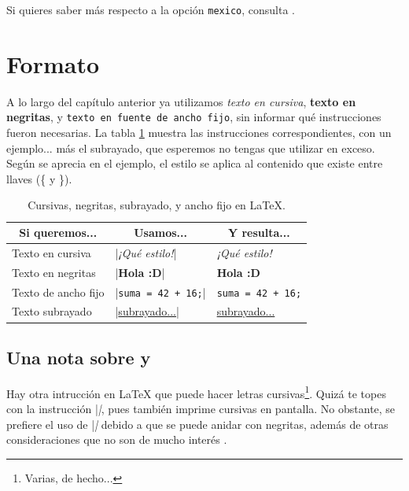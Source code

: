 Si quieres saber más respecto a la opción \texttt{mexico}, consulta \cite{bib:opciones_spanish}.



\section{Formato}
\label{sec:formato}



A lo largo del capítulo anterior ya utilizamos \emph{texto en cursiva}, \textbf{texto en negritas}, y \texttt{texto en fuente de ancho fijo}, sin informar qué instrucciones fueron necesarias. La tabla \ref{tab:instrucciones_estilo} muestra las instrucciones correspondientes, con un ejemplo... más el subrayado, que esperemos no tengas que utilizar en exceso. Según se aprecia en el ejemplo, el estilo se aplica al contenido que existe entre llaves (\{ y \}).

\begin{table}[ht!]
\centering
\begin{tabular}{lll}
\hline
\multicolumn{1}{c}{\textbf{Si queremos...}} & \multicolumn{1}{c}{\textbf{Usamos...}} & \multicolumn{1}{c}{\textbf{Y resulta...}}   \\
\hline
Texto en cursiva    & |\emph{¡Qué estilo!}|         & \emph{¡Qué estilo!}             \\
Texto en negritas   & |\textbf{Hola :D}|            & \textbf{Hola :D}                \\
Texto de ancho fijo & |\texttt{suma = 42 + 16;}|    & \texttt{suma = 42 + 16;}        \\
Texto subrayado     & |\underline{subrayado...}|    & \underline{subrayado...}        \\
\hline
\end{tabular}
\caption{Cursivas, negritas, subrayado, y ancho fijo en \LaTeX.} %
\label{tab:instrucciones_estilo}
\end{table}



\subsection{Una nota sobre  y }
\label{sub:una_nota_sobre_emph_y_textit}



Hay otra intrucción en \LaTeX{} que puede hacer letras cursivas\footnote{Varias, de hecho...}. Quizá te topes con la instrucción |\textit|, pues también imprime cursivas en pantalla. No obstante, se prefiere el uso de |\emph| debido a que se puede anidar con negritas, además de otras consideraciones que no son de mucho interés \cite{bib:emph}.

